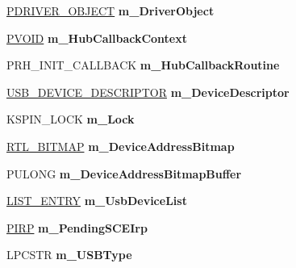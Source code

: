 \begin{DoxyCompactItemize}
\hyperlink{struct___d_r_i_v_e_r___o_b_j_e_c_t}{P\+D\+R\+I\+V\+E\+R\+\_\+\+O\+B\+J\+E\+CT} {\bfseries m\+\_\+\+Driver\+Object}
\item 
\mbox{\label{class_c_hub_controller_af3ce46ac9d2c041a444462fc80b0ef58}} 
\hyperlink{interfacevoid}{P\+V\+O\+ID} {\bfseries m\+\_\+\+Hub\+Callback\+Context}
\item 
\mbox{\label{class_c_hub_controller_a2f80e89bff58e7b6525ed43035bda370}} 
P\+R\+H\+\_\+\+I\+N\+I\+T\+\_\+\+C\+A\+L\+L\+B\+A\+CK {\bfseries m\+\_\+\+Hub\+Callback\+Routine}
\item 
\mbox{\label{class_c_hub_controller_abd5decd4c1091e6bb2f3d5e88f62ff9a}} 
\hyperlink{struct___u_s_b___d_e_v_i_c_e___d_e_s_c_r_i_p_t_o_r}{U\+S\+B\+\_\+\+D\+E\+V\+I\+C\+E\+\_\+\+D\+E\+S\+C\+R\+I\+P\+T\+OR} {\bfseries m\+\_\+\+Device\+Descriptor}
\item 
\mbox{\label{class_c_hub_controller_a1f44c2603716493620479df61526337d}} 
K\+S\+P\+I\+N\+\_\+\+L\+O\+CK {\bfseries m\+\_\+\+Lock}
\item 
\mbox{\label{class_c_hub_controller_a6d561fd96bb95c0fb30e43df03d819d2}} 
\hyperlink{struct___r_t_l___b_i_t_m_a_p}{R\+T\+L\+\_\+\+B\+I\+T\+M\+AP} {\bfseries m\+\_\+\+Device\+Address\+Bitmap}
\item 
\mbox{\label{class_c_hub_controller_a745f2ace183d64ec562510b14a1e987c}} 
P\+U\+L\+O\+NG {\bfseries m\+\_\+\+Device\+Address\+Bitmap\+Buffer}
\item 
\mbox{\label{class_c_hub_controller_ad81f3e5b74b7842cd6d1d8d3e92af8f0}} 
\hyperlink{struct___l_i_s_t___e_n_t_r_y}{L\+I\+S\+T\+\_\+\+E\+N\+T\+RY} {\bfseries m\+\_\+\+Usb\+Device\+List}
\item 
\mbox{\label{class_c_hub_controller_ad54319c3751736ead2728ba957e18c93}} 
\hyperlink{interfacevoid}{P\+I\+RP} {\bfseries m\+\_\+\+Pending\+S\+C\+E\+Irp}
\item 
\mbox{\label{class_c_hub_controller_a784d07ba9867b4552c9cce4ef2026232}} 
L\+P\+C\+S\+TR {\bfseries m\+\_\+\+U\+S\+B\+Type}
\end{DoxyCompactItemize}
